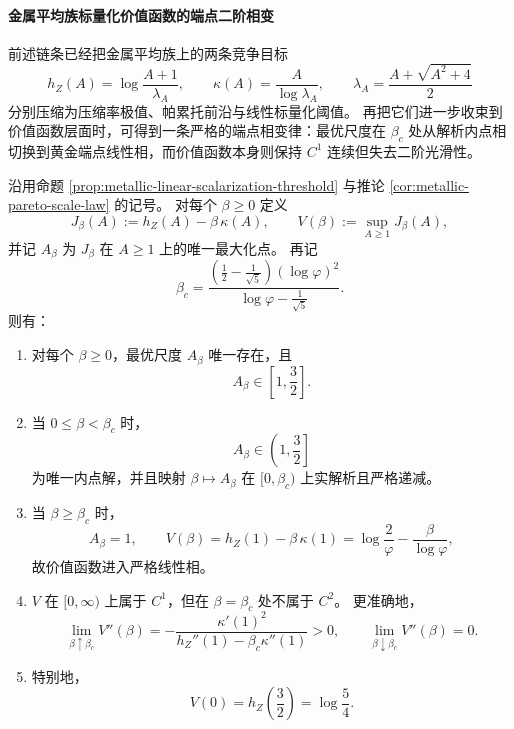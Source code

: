\paragraph{金属平均族标量化价值函数的端点二阶相变}
前述链条已经把金属平均族上的两条竞争目标
\[
h_Z(A)=\log\!\frac{A+1}{\lambda_A},
\qquad
\kappa(A)=\frac{A}{\log\lambda_A},
\qquad
\lambda_A=\frac{A+\sqrt{A^2+4}}{2}
\]
分别压缩为压缩率极值、帕累托前沿与线性标量化阈值。
再把它们进一步收束到价值函数层面时，可得到一条严格的端点相变律：最优尺度在 \(\beta_c\) 处从解析内点相切换到黄金端点线性相，而价值函数本身则保持 \(C^1\) 连续但失去二阶光滑性。

\begin{theorem}\label{thm:xi-time-part9xfa-metallic-value-c1-nonc2-transition}
沿用命题 \ref{prop:metallic-linear-scalarization-threshold} 与推论
\ref{cor:metallic-pareto-scale-law} 的记号。
对每个 \(\beta\ge 0\) 定义
\[
J_\beta(A):=h_Z(A)-\beta\,\kappa(A),
\qquad
V(\beta):=\sup_{A\ge 1}J_\beta(A),
\]
并记 \(A_\beta\) 为 \(J_\beta\) 在 \(A\ge 1\) 上的唯一最大化点。
再记
\[
\beta_c=
\frac{\left(\frac12-\frac1{\sqrt5}\right)(\log\varphi)^2}
{\log\varphi-\frac1{\sqrt5}}.
\]
则有：
\begin{enumerate}
  \item 对每个 \(\beta\ge 0\)，最优尺度 \(A_\beta\) 唯一存在，且
  \[
  A_\beta\in\left[1,\frac32\right].
  \]
  \item 当 \(0\le \beta<\beta_c\) 时，
  \[
  A_\beta\in\left(1,\frac32\right]
  \]
  为唯一内点解，并且映射 \(\beta\mapsto A_\beta\) 在 \([0,\beta_c)\) 上实解析且严格递减。
  \item 当 \(\beta\ge \beta_c\) 时，
  \[
  A_\beta=1,
  \qquad
  V(\beta)=h_Z(1)-\beta\,\kappa(1)
  =\log\!\frac{2}{\varphi}-\frac{\beta}{\log\varphi},
  \]
  故价值函数进入严格线性相。
  \item \(V\) 在 \([0,\infty)\) 上属于 \(C^1\)，但在 \(\beta=\beta_c\) 处不属于 \(C^2\)。
  更准确地，
  \[
  \lim_{\beta\uparrow \beta_c}V''(\beta)
  =
  -\frac{\kappa'(1)^2}{h_Z''(1)-\beta_c\kappa''(1)}
  >0,
  \qquad
  \lim_{\beta\downarrow \beta_c}V''(\beta)=0.
  \]
  \item 特别地，
  \[
  V(0)=h_Z\!\left(\frac32\right)=\log\!\frac54.
  \]
\end{enumerate}
\end{theorem}

